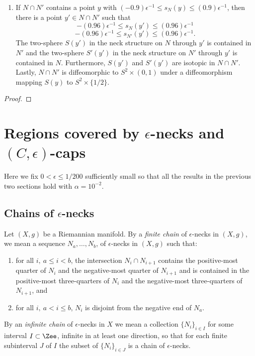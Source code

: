\begin{proposition}
\begin{enumerate}
\item[(5)] If $N\cap N'$ contains a point $y$ with $(-0.9)\epsilon^{-1}\le s_N(y)\le
(0.9)\epsilon^{-1}$, then there is a point $y'\in N\cap N'$ such
that
$$-(0.96)\epsilon^{-1}\le s_N(y')\le (0.96)\epsilon^{-1}$$
$$-(0.96)\epsilon^{-1}\le s_{N'}(y')\le (0.96)\epsilon^{-1}.$$
The two-sphere $S(y')$ in the neck structure on $N$ through $y'$ is contained
in $N'$ and the two-sphere $S'(y')$ in the neck structure on $N'$ through $y'$
is contained in $N$. Furthermore, $S(y')$ and $S'(y')$ are isotopic in $N\cap
N'$. Lastly, $N\cap N'$ is diffeomorphic to $S^2\times (0,1)$ under a
diffeomorphism mapping $S(y)$ to $S^2\times \{1/2\}$.
\end{enumerate}
\end{proposition}


\begin{proof}
\sketch
{}
\end{proof}






\section{Regions covered by $\epsilon$-necks and
$(C,\epsilon)$-caps}


Here we fix $0<\epsilon\le 1/200$ sufficiently small so that all the
results in the previous two sections hold with $\alpha=10^{-2}$.

\subsection{Chains of $\epsilon$-necks}

\begin{definition}
\label{def:chain-of-epsilon-necks}
Let $(X,g)$ be a Riemannian manifold. By a {\em finite chain} of
$\epsilon$-necks in $(X,g)$, we mean a sequence $N_a,\ldots,N_{b}$,
of $\epsilon$-necks in $(X,g)$ such that: \begin{enumerate} \item
for all $i,\ a\le i<b$, the intersection $N_i\cap N_{i+1}$ contains
the positive-most quarter of $N_i$ and the negative-most quarter of
$N_{i+1}$ and is contained in the positive-most three-quarters of
$N_i$ and the negative-most three-quarters of $N_{i+1}$, and
\item  for all $i,\ a<i\le b$, $N_i$ is disjoint from the negative end of
$N_a$.
\end{enumerate}
By an {\em infinite chain} of $\epsilon$-necks in $X$ we mean a
collection $\{N_i\}_{i\in I}$ for some interval $I\subset \Zee$,
infinite in at least one direction, so that for each finite
subinterval $J$ of $I$ the subset of $\{N_i\}_{i\in J}$ is a chain
of $\epsilon$-necks.
\end{definition}




